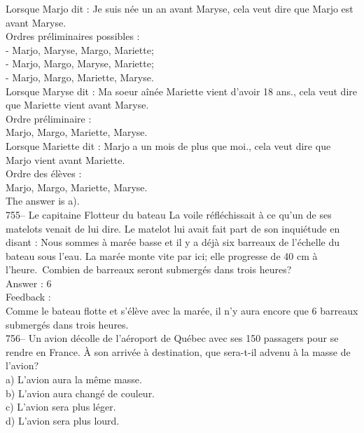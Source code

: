 ﻿\documentclass[letterpaper, 12pt]{article}
\begin{document}
Lorsque Marjo dit : \og Je suis n\'ee un an avant Maryse\fg , cela
veut dire que Marjo est avant Maryse.\\

Ordres pr\'eliminaires possibles :\\
- Marjo, Maryse, Margo, Mariette;\\
- Marjo, Margo, Maryse, Mariette;\\
- Marjo, Margo, Mariette, Maryse.\\

Lorsque Maryse dit : \og Ma soeur a\^in\'ee Mariette vient d'avoir
18 ans.\fg , cela veut dire  que Mariette vient avant Maryse.\\

Ordre pr\'eliminaire :\\
Marjo, Margo, Mariette, Maryse.\\

Lorsque Mariette dit : \og Marjo a un mois de plus que moi.\fg ,
cela veut dire que Marjo vient avant Mariette.\\

Ordre des \'el\`eves :\\
Marjo, Margo, Mariette, Maryse.\\

The answer is a).\\

755-- Le capitaine Flotteur du bateau La voile r\'efl\'echissait \`a
ce qu'un de ses matelots venait de lui dire.  Le matelot lui avait
fait part de son inqui\'etude en disant : \og Nous sommes \`a
mar\'ee basse et il y a d\'ej\`a  six barreaux de l'\'echelle du
bateau sous l'eau.  La mar\'ee monte vite par ici; elle progresse de
40 cm \`a l'heure.\fg\  Combien de
barreaux seront submerg\'es dans trois heures?\\


Answer : 6\\

Feedback : \\
Comme le bateau flotte et s'\'el\`eve avec la mar\'ee, il n'y aura encore
que 6 barreaux submerg\'es dans trois heures.\\

756-- Un avion d\'ecolle de l'a\'eroport de Qu\'ebec avec ses 150 passagers
pour se rendre en France.  \`A son arriv\'ee \`a destination, que sera-t-il
advenu \`a la masse de l'avion?\\
a) L'avion aura la m\^eme masse.\\
b) L'avion aura chang\'e de couleur.\\
c) L'avion sera plus l\'eger.\\
d) L'avion sera plus lourd.\\
\end{document}
